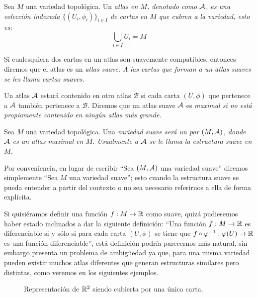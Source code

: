 \begin{definition}\label{Definición: Atlas}
	Sea $M$ una variedad topológica. Un \it{atlas} en $M$, denotado como $\mathcal{A}$, es una colección indexada $\{(U_i,\phi_i)\}_{i\in I}$ de cartas en $M$ que cubren a la variedad, esto es:
	\[\bigcup_{i \in I} U_i = M \]

	Si cualesquiera dos cartas en un atlas son suavemente compatibles, entonces diremos que el atlas es un \it{atlas suave}. A las cartas que forman a un atlas suaves se les llama \it{cartas suaves}.

	Un atlas $\mathcal{A}$ estará contenido en otro atlas $\mathcal{B}$ si cada carta $(U,\phi)$ que pertenece a $\mathcal{A}$ también pertenece a $\mathcal{B}$. Diremos que un atlas suave $\mathcal{A}$ es \it{maximal} si no está propiamente contenido en ningún atlas más grande.
\end{definition}

\begin{definition}\label{Definición: Variedad Suave}
	Sea $M$ una variedad topológica. Una \it{variedad suave} será un par $(M, \mathcal{A})$, donde $\mathcal{A}$ es un atlas maximal en $M$. Usualmente a $\mathcal{A}$ se le llama la \it{estructura suave} en $M$.
\end{definition}

Por conveniencia, en lugar de escribir \enquote{Sea $(M,\mathcal{A})$ una variedad suave} diremos simplemente \enquote{Sea $M$ una variedad suave}; esto cuando la estructura suave se pueda entender a partir del contexto o no sea necesario referirnos a ella de forma explícita.


Si quisiéramos definir una función $f: M \to \mathbb{R}$ como suave, quizá pudiesemos haber estado inclinados a dar la siguiente definición: \enquote{Una función $f: M \to \mathbb{R}$ es diferenciable si y sólo si para cada carta $(U,\phi)$ se tiene que $f\circ \varphi^{-1}: \varphi(U) \to \mathbb{R}$ es una función diferenciable}, está definición podría parecernos más natural, sin embargo presenta un problema de ambigüedad ya que, para una misma variedad pueden existir muchos atlas diferentes que generan estructuras similares pero distintas, como veremos en los siguientes ejemplos.

\begin{figure}[h]
	\begin{center}
		
		\caption{Representación de $\mathbb{R}^2$ siendo cubierta por una única carta.}
	\end{center}
\end{figure}

